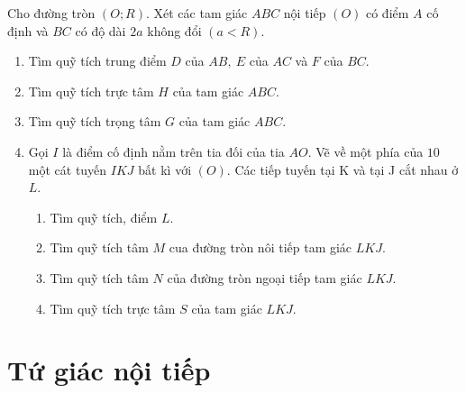 \begin{bt}%
	Cho đường tròn $(O;R)$. Xét các tam giác $ABC$ nội tiếp $(O)$ có điểm $A$ cố định và $BC$ có độ dài $2a$ không đổi $(a<R)$.
	\begin{enumerate}
		\item 	Tìm quỹ tích trung điểm $D$ của $AB,\ E$ của $AC$ và $F$ của $BC$.
		\item 	Tìm quỹ tích trực tâm $H$ của tam giác $ABC$.
		\item 	Tìm quỹ tích trọng tâm $G$ của tam giác $ABC$.
		\item 	Gọi $I$ là điểm cố định nằm trên tia đối của tia $AO$. Vẽ về một phía của $10$ một cát tuyến $IKJ$ bất kì với $(O)$. Các tiếp tuyến tại K và tại J cắt nhau ở $L$.
		\begin{enumerate}[1)]
			\item 	Tìm quỹ tích, điểm $L$.
			\item 	Tìm quỹ tích tâm $M$ cua đường tròn nôi tiếp tam giác $LKJ.$
			\item 	Tìm quỹ tích tâm $N$ của đường tròn ngoại tiếp tam giác $LKJ.$
			\item 	Tìm quỹ tích trực tâm $S$ của tam giác $LKJ.$ 
		\end{enumerate}		
	\end{enumerate}  
\end{bt}

\section{Tứ giác nội tiếp}

